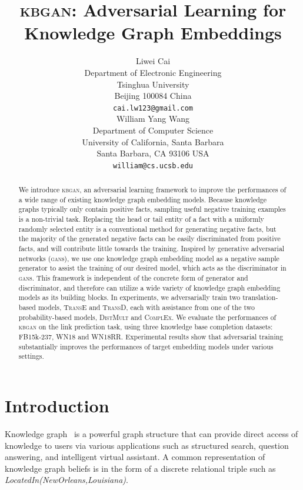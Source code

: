 \documentclass[11pt,a4paper]{article}
\title{\textsc{kbgan}: Adversarial Learning for Knowledge Graph Embeddings}
\author{Liwei Cai \\
  Department of Electronic Engineering \\
  Tsinghua University \\
  Beijing 100084 China \\
  {\tt cai.lw123@gmail.com} \\\And
  William Yang Wang \\
  Department of Computer Science \\
  University of California, Santa Barbara \\
  Santa Barbara, CA 93106 USA\\
  {\tt william@cs.ucsb.edu} \\}
\begin{document}
\maketitle
\begin{abstract}
We introduce \textsc{kbgan}, an adversarial learning framework to improve the performances of a wide range of existing knowledge graph embedding models. Because knowledge graphs typically only contain positive facts, sampling useful negative training examples is a non-trivial task. Replacing the head or tail entity of a fact with a uniformly randomly selected entity is a conventional method for generating negative facts, but the majority of the generated negative facts can be easily discriminated from positive facts, and will contribute little towards the training. Inspired by generative adversarial networks (\textsc{gan}s), we use one knowledge graph embedding model as a negative sample generator to assist the training of our desired model, which acts as the discriminator in \textsc{gan}s. 
This framework is independent of the concrete form of generator and discriminator, and therefore can utilize a wide variety of knowledge graph embedding models as its building blocks. In experiments, we adversarially train two translation-based models, \textsc{TransE} and \textsc{TransD}, each with assistance from one of the two probability-based models, \textsc{DistMult} and \textsc{ComplEx}. We evaluate the performances of \textsc{kbgan} on the link prediction task, using three knowledge base completion datasets: FB15k-237, WN18 and WN18RR. Experimental results show that adversarial training substantially improves the performances of target embedding models under various settings.
\end{abstract}

\section{Introduction}
Knowledge graph~\cite{dong2014knowledge} is a powerful graph structure that can provide direct access of knowledge to users via various applications such as structured search, question answering, and intelligent virtual assistant. A common representation of knowledge graph beliefs is in the form of a discrete relational triple such as \emph{LocatedIn(NewOrleans,Louisiana)}.
\end{document}
